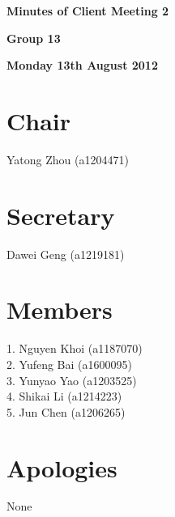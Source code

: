 \documentclass[11pt, a4paper]{article}
\begin{document}
 



\vspace*{15pt}

\begin{center}
\huge \bf Minutes of Client Meeting 2
\end{center}


\begin{center}
\Large \bf Group 13
\end{center}

\begin{center}
\Large \bf Monday 13th August 2012
\end{center}

\section*{Chair}
Yatong Zhou (a1204471)

\section*{Secretary}
Dawei Geng (a1219181)

\section*{Members}
1. Nguyen Khoi (a1187070)\\
2. Yufeng Bai (a1600095)\\
3. Yunyao Yao (a1203525)\\
4. Shikai Li (a1214223)\\
5. Jun Chen (a1206265)
\vspace*{10pt}

\section*{Apologies}
None

\end{document}
